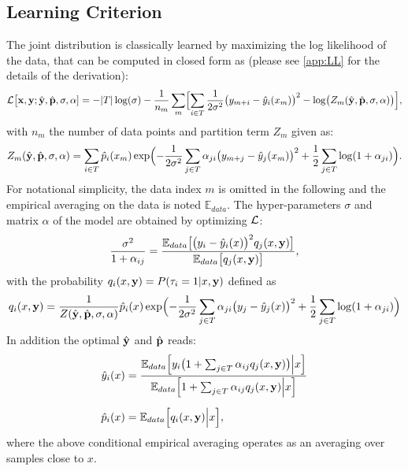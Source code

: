 \subsection{Learning Criterion}
The joint distribution is classically learned by maximizing the log likelihood of the data, that 
can be computed in closed form as (please see \cref{app:LL} for the details of the derivation): 
%
\begin{equation}\label{eq:LL}
  {\cal L}\bigl[ {\bf x, y};\hat {\bf y},\hat{\bf p},\sigma,{\bf \alpha}] = 
  -\vert T\vert\log(\sigma)-\frac{1}{n_m}\sum_m\Bigl[
    \sum_{i \in T}\frac{1}{2\sigma^2}\bigl(y_{m+i}-\hat y_i(x_m)\bigr)^2 - 
    \log\bigl(Z_m(\hat {\bf y},\hat{\bf p},\sigma,{\bf \alpha})\bigr)\Bigr],
\end{equation}
%
with $n_m$ the number of data points and partition term $Z_m$ given as:
\[
  Z_m(\hat {\bf y},\hat{\bf p},\sigma,{\bf \alpha}) = \sum_{i \in T}\hat p_i(x_m)\exp\Bigl(
    - \frac{1}{2\sigma^2}\sum_{j\in T}\alpha_{ji}\bigl(y_{m+j}-\hat y_j(x_m)\bigr)^2 
    + \frac{1}{2}\sum_{j\in T}\log(1+\alpha_{ji})\Bigr).
\]
For notational simplicity, the data index $m$ is omitted in the following and the empirical 
averaging on the data is noted ${\mathbb E}_{data}$. The hyper-parameters $\sigma$ and matrix 
$\alpha$ of the model are obtained by optimizing  ${\cal L}$:
%
\begin{equation}\label{eq:var}
  \frac{\sigma^2}{1+\alpha_{ij}} = 
  \frac{
    {\mathbb E}_{data}\bigl[\bigl(y_i-\hat y_i(x)\bigr)^2q_j(x,{\bf y})\bigr]
  }{
    {\mathbb E}_{data}\bigl[q_j(x,{\bf y})\bigr]
  },
\end{equation}
%
with the probability $q_i(x,{\bf y}) = P(\tau_i=1\vert x,{\bf y})$ defined as
%
\begin{equation}\label{eq:hatpi}
  q_i(x,{\bf y}) = \frac{1}{
    Z(\hat {\bf y},\hat{\bf p},\sigma,{\bf \alpha})
  } \hat p_i(x) 
  \exp\Bigl(
    - \frac{1}{2\sigma^2}\sum_{j\in T}\alpha_{ji}\bigl(y_j-\hat y_j(x)\bigr)^2 
    + \frac{1}{2}\sum_{j\in T}\log(1+\alpha_{ji})
  \Bigr)
\end{equation}
%
In addition the optimal $\hat {\bf y}$ and $\hat{\bf p}$ reads:
%
\begin{align}
  \hat y_i(x) &= 
    \frac{
      {\mathbb E}_{data} \Bigl[
          y_i\bigl(1+\sum_{j\in T}\alpha_{ij}q_j(x,{\bf y})\bigr)\Big\vert x
        \Bigr]
    }{
      {\mathbb E}_{data}\Bigl[1+\sum_{j\in T}\alpha_{ij}q_j(x,{\bf y})\Big\vert x\Bigr]
    }\label{eq:hyopt}\\[0.2cm]
  \hat p_i(x) &= {\mathbb E}_{data}\Bigl[q_i(x,{\bf y})\Big\vert x \Bigr],\label{eq:tildep}
\end{align}
%
where the above conditional empirical averaging operates as an averaging over samples close to $x$.


